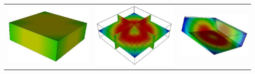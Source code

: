 \begin{table}[h]
\begin{tabular}{c c c}
\includegraphics[width=\thumbnailwidth]{figures/Map} &
\includegraphics[width=\thumbnailwidth]{figures/MapOnPlaneCut} &
\includegraphics[width=\thumbnailwidth]{figures/MapOnPlaneClip} \\

\end{tabular}
\end{table}
